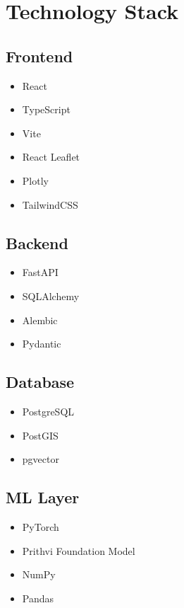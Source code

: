 \documentclass[11pt,a4paper]{article}
\begin{document}
\section{Technology Stack}

\subsection{Frontend}

\begin{itemize}
\item React
\item TypeScript
\item Vite
\item React Leaflet
\item Plotly
\item TailwindCSS
\end{itemize}

\subsection{Backend}

\begin{itemize}
\item FastAPI
\item SQLAlchemy
\item Alembic
\item Pydantic
\end{itemize}

\subsection{Database}

\begin{itemize}
\item PostgreSQL
\item PostGIS
\item pgvector
\end{itemize}

\subsection{ML Layer}

\begin{itemize}
\item PyTorch
\item Prithvi Foundation Model
\item NumPy
\item Pandas
\end{itemize}
\end{document}
